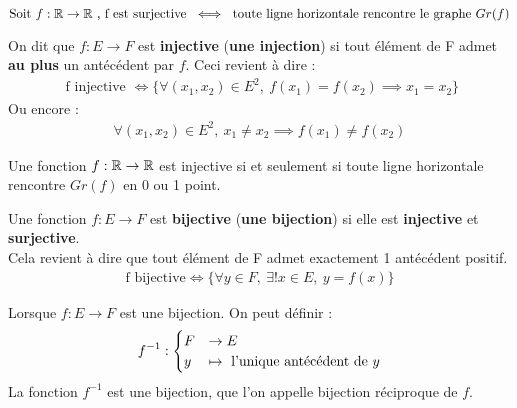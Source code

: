 \begin{remarque}~
	\\
	$\text{Soit } f : \mathbb{R} \to \mathbb{R} \text{ , f est surjective } \iff \text{ toute ligne horizontale rencontre le graphe } Gr(f)$ \\
\end{remarque}

\begin{graybox}
	\begin{definition}[Injectivité]
		On dit que $f : E \to F$ est \textbf{injective} (\textbf{une injection}) si tout élément de F admet \textbf{au plus} un antécédent par $f$.
		Ceci revient à dire : 
		\begin{align*}
			\text{ f injective } \iff \{\forall (x_1, x_2) \in E^2,\ f(x_1) = f(x_2) \implies x_1 = x_2 \}
		\end{align*}
		Ou encore :
		\begin{align*}
			\forall(x_1, x_2) \in E^2,\ x_1 \neq x_2 \implies f(x_1) \neq f(x_2)
		\end{align*}
	\end{definition}
\end{graybox}

\begin{remarque}
	Une fonction $f : \mathbb{R} \to \mathbb{R}$ est injective si et seulement si toute ligne horizontale rencontre $Gr(f)$ en 0 ou 1 point.
\end{remarque}

\begin{graybox}
	\begin{definition}[Bijectivité]
		Une fonction $f : E \to F$ est \textbf{bijective} (\textbf{une bijection}) si elle est \textbf{injective} et \textbf{surjective}. 
		\\
		Cela revient à dire que tout élément de F admet exactement 1 antécédent positif.
		\begin{align*}
			\text{f bijective} \iff \{\forall y \in F,\ \exists! x \in E,\ y = f(x)\}
		\end{align*}
	\end{definition}
\end{graybox}

\begin{graybox}
	\begin{definition}
		Lorsque $f : E \to F$ est une bijection. On peut définir :
		\begin{align*}
			f^{-1} :
			\begin{cases}
				F &\to E \\
				y &\mapsto \textnormal{ l'unique antécédent de } y
			\end{cases}
		\end{align*}
		La fonction $f^{-1}$ est une bijection, que l'on appelle bijection réciproque de $f$.
	\end{definition}
\end{graybox}

